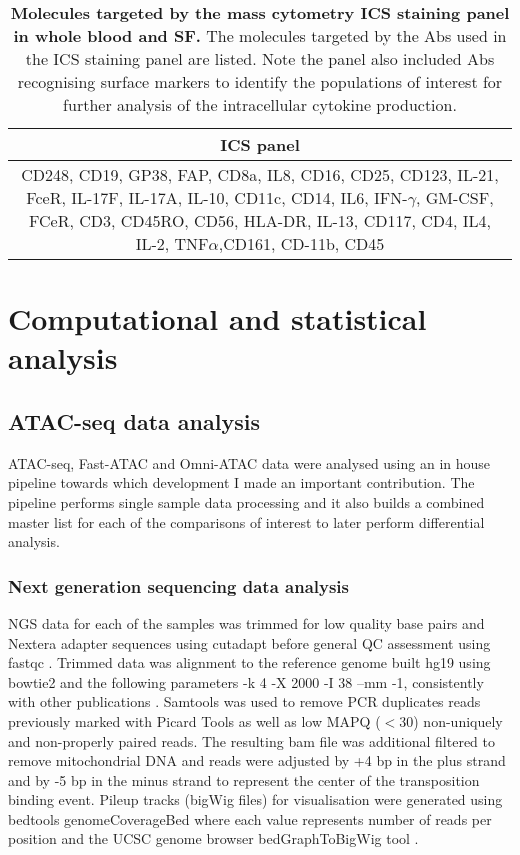 \begin{table}[htbp]
\setlength{\tabcolsep}{20pt}
\renewcommand{\arraystretch}{1.5}
\begin{tabular}{@{} c}
\toprule
\textbf{ICS panel} \\
\midrule
CD248, CD19, GP38, FAP, CD8a, IL8, CD16, CD25, CD123, IL-21, FceR, 
IL-17F, IL-17A, IL-10, CD11c, CD14, IL6, IFN-$\gamma$, GM-CSF, FCeR, CD3, 
CD45RO, CD56, HLA-DR, IL-13, CD117, CD4, IL4, IL-2, TNF$\alpha$,CD161, CD-11b, CD45 \\
\bottomrule
\end{tabular}
\medskip %
\caption[Molecules targeted by the mass cytometry ICS staining panel in whole blood and SF.]{\textbf{Molecules targeted by the mass cytometry ICS staining panel in whole blood and SF.} The molecules targeted by the Abs used in the ICS staining panel are listed. Note the panel also included Abs recognising surface markers to identify the populations of interest for further analysis of the intracellular cytokine production.}
\label{tab:CyTOF}
\end{table}
\bigskip %


\section{Computational and statistical analysis}

\subsection{ATAC-seq data analysis}
\label{ATAC_analysis}
ATAC-seq, Fast-ATAC and Omni-ATAC data were analysed using an in house pipeline towards which development I made an important contribution. The pipeline performs single sample data processing and it also builds a combined master list for each of the comparisons of interest to later perform differential analysis. 

\subsubsection{Next generation sequencing data analysis}
NGS data for each of the samples was trimmed for low quality base pairs and Nextera adapter sequences using cutadapt \parencite{} before general QC assessment using fastqc \parencite{}. Trimmed data was alignment to the reference genome built hg19 using bowtie2 \parencite{Langmead2006} and the following parameters -k 4 -X 2000 -I 38 --mm -1, consistently with other publications \parencite{Buenrostro2013, Corces2016}. Samtools \parencite{} was used to remove PCR duplicates reads previously marked with Picard Tools \parencite{} as well as low MAPQ (${<}$30) non-uniquely and non-properly paired reads. The resulting bam file was additional filtered to remove mitochondrial DNA and reads were adjusted by +4 bp in the plus strand and by -5 bp in the minus strand to represent the center of the transposition binding event. Pileup tracks (bigWig files) for visualisation were generated using bedtools genomeCoverageBed where each value represents number of reads per position \parencite{} and the UCSC genome browser bedGraphToBigWig tool \parencite{}.  


